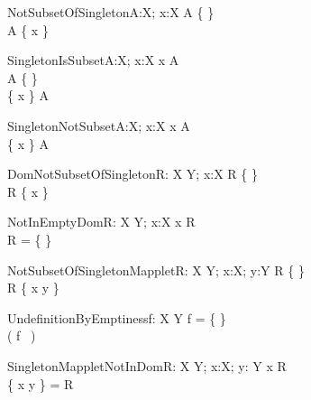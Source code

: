 \begin{theorem}{NotSubsetOfSingleton}{A:\power X; x:X}
A \neq \{ \} \\
A \subset \{ x \} 
\end{theorem}

\begin{theorem}{SingletonIsSubset}{A:\power X; x:X}
x \in A \\
A \neq \{ \} \\
\lnot \{ x \} \subseteq A
\end{theorem}

\begin{theorem}{SingletonNotSubset}{A:\power X; x:X}
x \notin A \\
\{ x \} \subset A
\end{theorem}

\begin{theorem}{DomNotSubsetOfSingleton}{R: X \rel Y; x:X}
R \neq \{ \} \\
\dom R \subset \{ x \} 
\end{theorem}

\begin{theorem}{NotInEmptyDom}{R: X \rel Y; x:X}
x \in \dom R \\
R = \{ \}
\end{theorem}

\begin{theorem}{NotSubsetOfSingletonMapplet}{R: X \rel Y; x:X; y:Y}
R \neq \{ \} \\
\dom R \subset \dom \{ x \mapsto y \} 
\end{theorem}




\begin{theorem}{UndefinitionByEmptiness}{f: X \pfun Y}
f = \{ \} \\
\sw( f~ \anything ) \\
\end{theorem}

\begin{theorem}{SingletonMappletNotInDom}{R: X \rel Y; x:X; y: Y}
x \notin \dom R \\
\dom \{ x \mapsto y \} = \dom R
\end{theorem}

